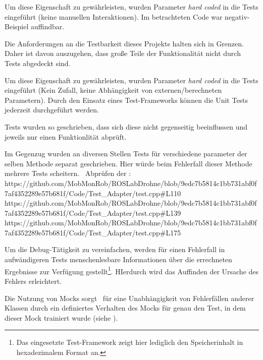 Um diese Eigenschaft zu gewährleisten, wurden Parameter \textit{hard coded} in die Tests eingeführt (keine manuellen Interaktionen).
Im betrachteten Code war negativ-Beispiel auffindbar.


Die Anforderungen an die Testbarkeit dieses Projekts halten sich in Grenzen. Daher ist davon auszugehen, dass große Teile der Funktionalität nicht durch Tests abgedeckt sind.\\


Um diese Eigenschaft zu gewährleisten, wurden Parameter \textit{hard coded} in die Tests eingeführt (Kein Zufall, keine Abhängigkeit von externen/berechneten Parametern).
Durch den Einsatz eines Test-Frameworks können die Unit Tests jederzeit durchgeführt werden.


Tests wurden so geschrieben, dass sich diese nicht gegenseitig beeinflussen und jeweils nur einen Funktionlität abprüft.

Im Gegenzug wurden an diversen Stellen Tests für verschiedene parameter der selben Methode separat geschrieben. Hier würde beim Fehlerfall dieser Methode mehrere Tests scheitern.
\zB\ Abprüfen der :\\
https://github.com/MobMonRob/ROSLabDrohne/blob/9edc7b5814c1bb731abf0f7af4352289e57b681f/Code/Test\_Adapter/test.cpp\#L110
https://github.com/MobMonRob/ROSLabDrohne/blob/9edc7b5814c1bb731abf0f7af4352289e57b681f/Code/Test\_Adapter/test.cpp\#L139
https://github.com/MobMonRob/ROSLabDrohne/blob/9edc7b5814c1bb731abf0f7af4352289e57b681f/Code/Test\_Adapter/test.cpp\#L175

Um die Debug-Tätigkeit zu vereinfachen, werden für einen Fehlerfall in aufwändigeren Tests menschenlesbare Informationen über die errechneten Ergebnisse zur Verfügung gestellt\footnote{Das eingesetzte Test-Framework zeigt hier lediglich den Speicherinhalt in hexadezimalem Format an.}. HIerdurch wird das Auffinden der Ursache des Fehlers erleichtert.

Die Nutzung von Mocks sorgt \ua\ für eine Unabhängigkeit von Fehlerfällen anderer Klassen durch ein definiertes Verhalten des Mocks für genau den Test, in dem dieser Mock trainiert wurde (siehe ).


